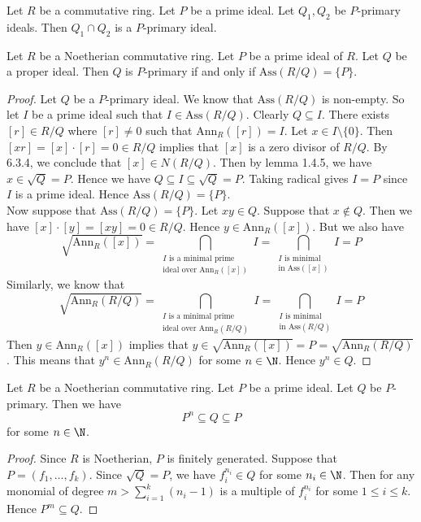 \documentclass[a4paper]{article}
\begin{document}
\begin{lmm}{}{} Let $R$ be a commutative ring. Let $P$ be a prime ideal. Let $Q_1,Q_2$ be $P$-primary ideals. Then $Q_1\cap Q_2$ is a $P$-primary ideal. 
\end{lmm}

\begin{prp}{}{} Let $R$ be a Noetherian commutative ring. Let $P$ be a prime ideal of $R$. Let $Q$ be a proper ideal. Then $Q$ is $P$-primary if and only if $\text{Ass}(R/Q)=\{P\}$. 
\begin{proof}
Let $Q$ be a $P$-primary ideal. We know that $\text{Ass}(R/Q)$ is non-empty. So let $I$ be a prime ideal such that $I\in\text{Ass}(R/Q)$. Clearly $Q\subseteq I$. There exists $[r]\in R/Q$ where $[r]\neq 0$ such that $\text{Ann}_R([r])=I$. Let $x\in I\setminus\{0\}$. Then $[xr]=[x]\cdot[r]=0\in R/Q$ implies that $[x]$ is a zero divisor of $R/Q$. By 6.3.4, we conclude that $[x]\in N(R/Q)$. Then by lemma 1.4.5, we have $x\in\sqrt{Q}=P$. Hence we have $Q\subseteq I\subseteq\sqrt{Q}=P$. Taking radical gives $I=P$ since $I$ is a prime ideal. Hence $\text{Ass}(R/Q)=\{P\}$. \\

Now suppose that $\text{Ass}(R/Q)=\{P\}$. Let $xy\in Q$. Suppose that $x\notin Q$. Then we have $[x]\cdot[y]=[xy]=0\in R/Q$. Hence $y\in\text{Ann}_R([x])$. But we also have $$\sqrt{\text{Ann}_R([x])}=\bigcap_{\substack{I\text{ is a minimal prime}\\\text{ideal over Ann}_R([x])}}I=\bigcap_{\substack{I\text{ is minimal}\\\text{in Ass}([x])}}I=P$$ Similarly, we know that $$\sqrt{\text{Ann}_R(R/Q)}=\bigcap_{\substack{I\text{ is a minimal prime}\\\text{ideal over Ann}_R(R/Q)}}I=\bigcap_{\substack{I\text{ is minimal}\\\text{in Ass}(R/Q)}}I=P$$ Then $y\in\text{Ann}_R([x])$ implies that $y\in\sqrt{\text{Ann}_R([x])}=P=\sqrt{\text{Ann}_R(R/Q)}$. This means that $y^n\in\text{Ann}_R(R/Q)$ for some $n\in\N$. Hence $y^n\in Q$. 
\end{proof}
\end{prp}

\begin{lmm}{}{} Let $R$ be a Noetherian commutative ring. Let $P$ be a prime ideal. Let $Q$ be $P$-primary. Then we have $$P^n\subseteq Q\subseteq P$$ for some $n\in\N$. 
\begin{proof}
Since $R$ is Noetherian, $P$ is finitely generated. Suppose that $P=(f_1,\dots,f_k)$. Since $\sqrt{Q}=P$, we have $f_i^{n_i}\in Q$ for some $n_i\in\N$. Then for any monomial of degree $m>\sum_{i=1}^k(n_i-1)$ is a multiple of $f_i^{n_i}$ for some $1\leq i\leq k$. Hence $P^m\subseteq Q$. 
\end{proof}
\end{lmm}
\end{document}
